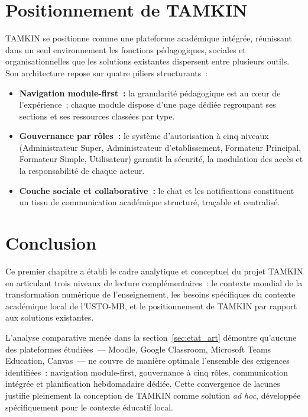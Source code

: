 \documentclass[12pt,a4paper,oneside]{report}
\begin{document}
\section{Positionnement de TAMKIN}
\label{sec:positionnement}

TAMKIN se positionne comme une plateforme acad\'emique int\'egr\'ee, r\'eunissant dans un seul environnement les fonctions p\'edagogiques, sociales et organisationnelles que les solutions existantes dispersent entre plusieurs outils. Son architecture repose sur quatre piliers structurants~:

\begin{itemize}
  \item \textbf{Navigation module-first~:} la granularit\'e p\'edagogique est au c\oe ur de l'exp\'erience~; chaque module dispose d'une page d\'edi\'ee regroupant ses sections et ses ressources class\'ees par type.
  \item \textbf{Gouvernance par r\^oles~:} le syst\`eme d'autorisation \`a cinq niveaux (Administrateur Super, Administrateur d'etablissement, Formateur Principal, Formateur Simple, Utilisateur) garantit la s\'ecurit\'e, la modulation des acc\`es et la responsabilit\'e de chaque acteur.
  \item \textbf{Couche sociale et collaborative~:} le chat et les notifications constituent un tissu de communication acad\'emique structur\'e, tra\c{c}able et centralis\'e.
\end{itemize}

\section{Conclusion}
\label{sec:conclusion}

Ce premier chapitre a \'etabli le cadre analytique et conceptuel du projet TAMKIN en articulant trois niveaux de lecture compl\'ementaires~: le contexte mondial de la transformation num\'erique de l'enseignement, les besoins sp\'ecifiques du contexte acad\'emique local de l'USTO-MB, et le positionnement de TAMKIN par rapport aux solutions existantes.

L'analyse comparative men\'ee dans la section~\ref{sec:etat_art} d\'emontre qu'aucune des plateformes \'etudi\'ees~--- Moodle, Google Classroom, Microsoft Teams Education, Canvas~--- ne couvre de mani\`ere optimale l'ensemble des exigences identifi\'ees~: navigation module-first, gouvernance \`a cinq r\^oles, communication int\'egr\'ee et planification hebdomadaire d\'edi\'ee. Cette convergence de lacunes justifie pleinement la conception de TAMKIN comme solution \textit{ad hoc}, d\'evelopp\'ee sp\'ecifiquement pour le contexte éducatif local.
\end{document}
